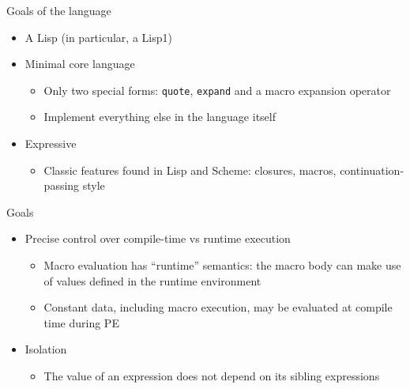 

\begin{frame}
\maketitle
\end{frame}

\begin{frame}[fragile]{Goals of the \lang language}
  \begin{itemize}
    \item A Lisp (in particular, a Lisp1)
    \item Minimal core language
      \begin{itemize}
        \item Only two special forms: \verb|quote|, \verb|expand| and a macro expansion operator
        \item Implement everything else in the language itself
      \end{itemize}
    \item Expressive
      \begin{itemize}
        \item Classic features found in Lisp and Scheme: closures, macros, continuation-passing style
      \end{itemize}
  \end{itemize}
\end{frame}

\begin{frame}[fragile]{Goals}
\begin{itemize}
    \item Precise control over compile-time vs runtime execution
        \begin{itemize}
            \item Macro evaluation has ``runtime'' semantics: the macro body can make use of values defined in the runtime environment
            \item Constant data, including macro execution, may be evaluated at compile time during PE
        \end{itemize}
    \item Isolation
        \begin{itemize}
            \item The value of an expression does not depend on its sibling expressions
        \end{itemize}
\end{itemize}
\end{frame}

